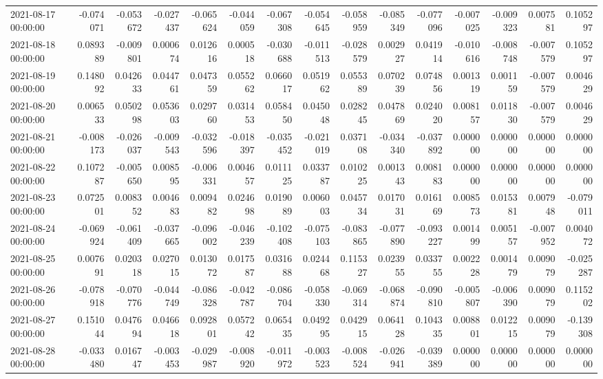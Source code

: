 \begin{tabular}{lrrrrrrrrrrrrrr}
2021-08-17 00:00:00 & -0.074071 & -0.053672 & -0.027437 & -0.065624 & -0.044059 & -0.067308 & -0.054645 & -0.058959 & -0.085349 & -0.077096 & -0.007025 & -0.009323 & 0.007581 & 0.105297 \\
2021-08-18 00:00:00 & 0.089389 & -0.009801 & 0.000674 & 0.012616 & 0.000518 & -0.030688 & -0.011513 & -0.028579 & 0.002927 & 0.041914 & -0.010616 & -0.008748 & -0.007579 & 0.105297 \\
2021-08-19 00:00:00 & 0.148092 & 0.042633 & 0.044761 & 0.047359 & 0.055262 & 0.066017 & 0.051962 & 0.055389 & 0.070239 & 0.074856 & 0.001319 & 0.001159 & -0.007579 & 0.004629 \\
2021-08-20 00:00:00 & 0.006533 & 0.050298 & 0.053603 & 0.029760 & 0.031453 & 0.058450 & 0.045048 & 0.028245 & 0.047869 & 0.024020 & 0.008157 & 0.011830 & -0.007579 & 0.004629 \\
2021-08-21 00:00:00 & -0.008173 & -0.026037 & -0.009543 & -0.032596 & -0.018397 & -0.035452 & -0.021019 & 0.037108 & -0.034340 & -0.037892 & 0.000000 & 0.000000 & 0.000000 & 0.000000 \\
2021-08-22 00:00:00 & 0.107287 & -0.005650 & 0.008595 & -0.006331 & 0.004657 & 0.011125 & 0.033787 & 0.010225 & 0.001343 & 0.008183 & 0.000000 & 0.000000 & 0.000000 & 0.000000 \\
2021-08-23 00:00:00 & 0.072501 & 0.008352 & 0.004683 & 0.009482 & 0.024698 & 0.019089 & 0.006003 & 0.045734 & 0.017031 & 0.016169 & 0.008573 & 0.015381 & 0.007948 & -0.079011 \\
2021-08-24 00:00:00 & -0.069924 & -0.061409 & -0.037665 & -0.096002 & -0.046239 & -0.102408 & -0.075103 & -0.083865 & -0.077890 & -0.093227 & 0.001499 & 0.005157 & -0.007952 & 0.004072 \\
2021-08-25 00:00:00 & 0.007691 & 0.020318 & 0.027015 & 0.013072 & 0.017587 & 0.031688 & 0.024468 & 0.115327 & 0.023955 & 0.033755 & 0.002228 & 0.001479 & 0.009079 & -0.025287 \\
2021-08-26 00:00:00 & -0.078918 & -0.070776 & -0.044749 & -0.086328 & -0.042787 & -0.086704 & -0.058330 & -0.069314 & -0.068874 & -0.090810 & -0.005807 & -0.006390 & 0.009079 & 0.115202 \\
2021-08-27 00:00:00 & 0.151044 & 0.047694 & 0.046618 & 0.092801 & 0.057242 & 0.065435 & 0.049295 & 0.042915 & 0.064128 & 0.104335 & 0.008801 & 0.012215 & 0.009079 & -0.139308 \\
2021-08-28 00:00:00 & -0.033480 & 0.016747 & -0.003453 & -0.029987 & -0.008920 & -0.011972 & -0.003523 & -0.008524 & -0.026941 & -0.039389 & 0.000000 & 0.000000 & 0.000000 & 0.000000 \\

\end{tabular}
